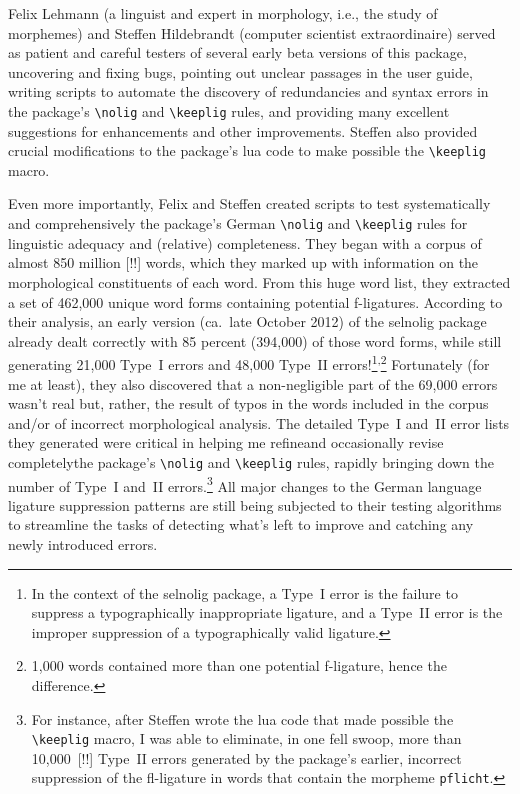 \documentclass[11pt]{article}
\newcommand{\pkg}[1]{\textsf{#1}}
\newcommand{\opt}[1]{\texttt{#1}}
\newcommand{\cmmd}[1]{\texttt{\textbackslash #1}}
\begin{document}
Felix Lehmann (a linguist and expert in morphology, i.e., the study of morphemes) and Steffen Hildebrandt (computer scientist extraordinaire) served as patient and careful testers of several early beta versions of this package, uncovering and fixing bugs, pointing out unclear passages in the user guide, writing scripts to automate the discovery of redundancies and syntax errors in the package's \cmmd{nolig} and \cmmd{keeplig} rules, and providing many excellent suggestions for enhancements and other improvements. Steffen also provided crucial modifications to the package's lua code to make possible the \cmmd{keeplig} macro.

Even more importantly, Felix and Steffen created scripts to test systematically and comprehensively the package's German \cmmd{nolig} and \cmmd{keeplig} rules for linguistic adequacy and (relative) completeness.
They began with a corpus of almost 850 million [!!] words, which they marked up with information on the morphological constituents of each word. From this huge word list, they extracted a set of 462,000 unique word forms containing potential f-ligatures.
According to their analysis, an early version (ca.\ late October 2012) of the \pkg{selnolig} package already dealt correctly with 85 percent (394,000) of those word forms, while still generating 21,000 Type~I errors and 48,000 Type~II errors!\footnote{In the context of the \pkg{selnolig} package, a Type~I error is the failure to suppress a typographically inappropriate ligature, and a Type~II error is the improper suppression of a typographically valid ligature.}\textsuperscript{,}\footnote{1,000 words contained more than one potential f-ligature, hence the difference.} 
Fortunately (for me at least), they also discovered that a non-negligible part of the 69,000 errors wasn't real but, rather, the result of typos in the words included in the corpus and/or of incorrect morphological analysis. The detailed Type~I and~II error lists they generated were critical in helping me refine\textemdash and occasionally revise completely\textemdash the package's \cmmd{nolig} and \cmmd{keeplig} rules, rapidly bringing down the number of Type~I and~II errors.\footnote{For instance, after Steffen wrote the lua code that made possible the \cmmd{keeplig} macro, I was able to eliminate, in one fell swoop, more than 10,000~[!!] Type~II errors generated by the package's earlier, incorrect suppression of the fl-ligature in words that contain the morpheme \opt{pflicht}. } All major changes to the German language ligature suppression patterns are still being subjected to their testing algorithms to streamline the tasks of detecting what's left to improve and catching any newly introduced errors.
\end{document}
